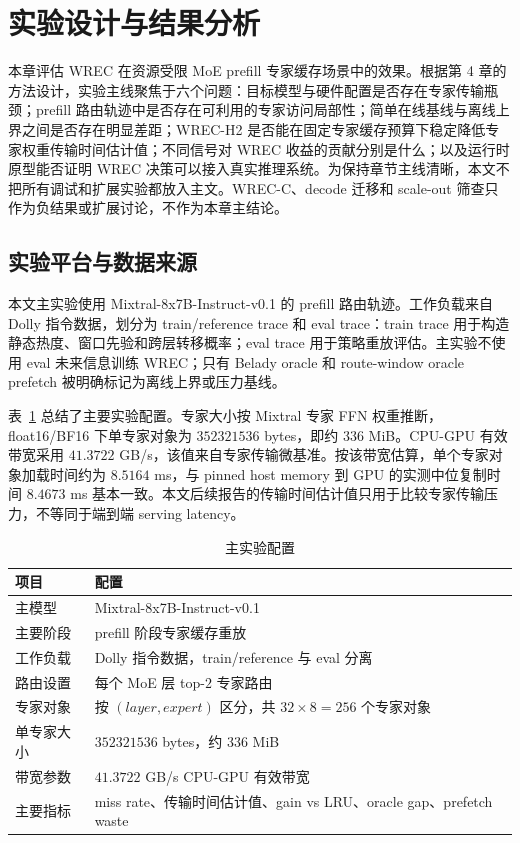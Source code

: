 \cleardoublepage

\section{实验设计与结果分析}

本章评估 WREC 在资源受限 MoE prefill 专家缓存场景中的效果。根据第 4 章的方法设计，实验主线聚焦于六个问题：目标模型与硬件配置是否存在专家传输瓶颈；prefill 路由轨迹中是否存在可利用的专家访问局部性；简单在线基线与离线上界之间是否存在明显差距；WREC-H2 是否能在固定专家缓存预算下稳定降低专家权重传输时间估计值；不同信号对 WREC 收益的贡献分别是什么；以及运行时原型能否证明 WREC 决策可以接入真实推理系统。为保持章节主线清晰，本文不把所有调试和扩展实验都放入主文。WREC-C、decode 迁移和 scale-out 筛查只作为负结果或扩展讨论，不作为本章主结论。

\subsection{实验平台与数据来源}

本文主实验使用 Mixtral-8x7B-Instruct-v0.1 的 prefill 路由轨迹。工作负载来自 Dolly 指令数据，划分为 train/reference trace 和 eval trace：train trace 用于构造静态热度、窗口先验和跨层转移概率；eval trace 用于策略重放评估。主实验不使用 eval 未来信息训练 WREC；只有 Belady oracle 和 route-window oracle prefetch 被明确标记为离线上界或压力基线。

表~\ref{tab:experiment-setup} 总结了主要实验配置。专家大小按 Mixtral 专家 FFN 权重推断，float16/BF16 下单专家对象为 $352321536$ bytes，即约 $336$ MiB。CPU-GPU 有效带宽采用 $41.3722$ GB/s，该值来自专家传输微基准。按该带宽估算，单个专家对象加载时间约为 $8.5164$ ms，与 pinned host memory 到 GPU 的实测中位复制时间 $8.4673$ ms 基本一致。本文后续报告的传输时间估计值只用于比较专家传输压力，不等同于端到端 serving latency。

\begin{table}[ht]
    \centering
    \caption{\label{tab:experiment-setup}主实验配置}
    \begin{tabularx}{\linewidth}{lX}
        \hline
        项目 & 配置 \\ \hline
        主模型 & Mixtral-8x7B-Instruct-v0.1 \\ \hline
        主要阶段 & prefill 阶段专家缓存重放 \\ \hline
        工作负载 & Dolly 指令数据，train/reference 与 eval 分离 \\ \hline
        路由设置 & 每个 MoE 层 top-$2$ 专家路由 \\ \hline
        专家对象 & 按 $(layer, expert)$ 区分，共 $32\times 8=256$ 个专家对象 \\ \hline
        单专家大小 & $352321536$ bytes，约 $336$ MiB \\ \hline
        带宽参数 & $41.3722$ GB/s CPU-GPU 有效带宽 \\ \hline
        主要指标 & miss rate、传输时间估计值、gain vs LRU、oracle gap、prefetch waste \\ \hline
    \end{tabularx}
\end{table}

